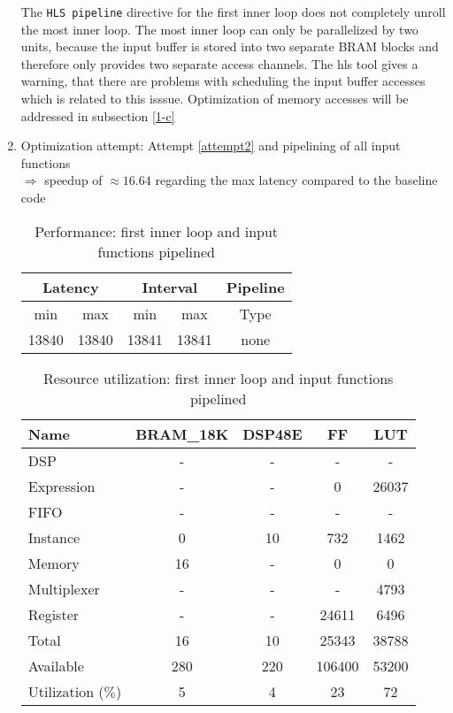 \documentclass[../main.tex]{subfiles}
\begin{document}
\begin{enumerate}
	The \texttt{HLS pipeline} directive for the first inner loop does not completely unroll the most inner loop. The most inner loop can only be parallelized by two units, because the input buffer is stored into two separate BRAM blocks and therefore only provides two separate access channels. The hls tool gives a warning, that there are problems with scheduling the input buffer accesses which is related to this isssue. Optimization of memory accesses will be addressed in subsection \ref{1-c}

	\item Optimization attempt: Attempt \ref{attempt2} and pipelining of all input functions \\
		\label{attempt3}
		$\Rightarrow$ speedup of $\approx 16.64 $ regarding the max latency compared to the baseline code
	\begin{table}[H]
		\centering
		\begin{tabular}{ccccc}
			\multicolumn{2}{c}{Latency} & \multicolumn{2}{c}{Interval} & Pipeline\\
			\hline
			min  &   max  &   min  &   max  &   Type  \\
			13840&  13840&  13841&  13841&   none
		\end{tabular}
		\caption{Performance: first inner loop and input functions pipelined}
		\label{1-b-perf-table-3}
	\end{table}

	\begin{table}[H]
		\centering
		\begin{tabular}{lcccc}
			Name      & BRAM\_18K& DSP48E&   FF   &  LUT  \\
			\hline
			DSP              &        -&      -&       -&      -    \\
			Expression       &        -&      -&       0&  26037    \\
			FIFO             &        -&      -&       -&      -    \\
			Instance         &        0&     10&     732&   1462    \\
			Memory           &       16&      -&       0&      0    \\
			Multiplexer      &        -&      -&       -&   4793    \\
			Register         &        -&      -&   24611&   6496    \\
			\hline                                                  
			Total            &       16&     10&   25343&  38788    \\
			Available        &      280&    220&  106400&  53200    \\
			\hline                                                  
			Utilization ($\%$)  &        5&      4&      23&     72 
		\end{tabular}
		\caption{Resource utilization: first inner loop and input functions pipelined}
		\label{1-b-resources-3}
	\end{table}


\end{enumerate}
\end{document}
